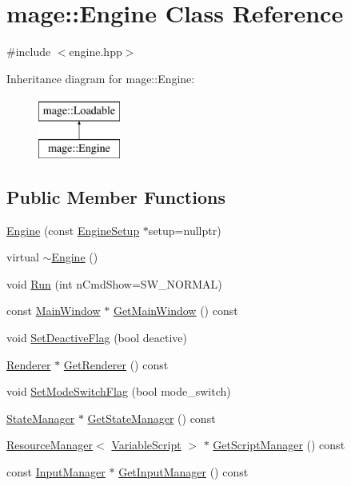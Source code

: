 \hypertarget{classmage_1_1_engine}{}\section{mage\+:\+:Engine Class Reference}
\label{classmage_1_1_engine}


{\ttfamily \#include $<$engine.\+hpp$>$}

Inheritance diagram for mage\+:\+:Engine\+:\begin{figure}[H]
\begin{center}
\leavevmode
\includegraphics[height=2.000000cm]{classmage_1_1_engine}
\end{center}
\end{figure}
\subsection*{Public Member Functions}
\begin{DoxyCompactItemize}
\item 
\hyperlink{classmage_1_1_engine_a4d15f81bb7d97b659d2d72ead3a88319}{Engine} (const \hyperlink{structmage_1_1_engine_setup}{Engine\+Setup} $\ast$setup=nullptr)
\item 
virtual \hyperlink{classmage_1_1_engine_a34628556f8397d70ed018d71e343c2f5}{$\sim$\+Engine} ()
\item 
void \hyperlink{classmage_1_1_engine_a246c82d0e55bc29e73aecbc365464ec8}{Run} (int n\+Cmd\+Show=S\+W\+\_\+\+N\+O\+R\+M\+AL)
\item 
const \hyperlink{classmage_1_1_main_window}{Main\+Window} $\ast$ \hyperlink{classmage_1_1_engine_a28baaa54158acac8ffca3b6f31f63f82}{Get\+Main\+Window} () const
\item 
void \hyperlink{classmage_1_1_engine_a942bfa9892fa79bb1068d7c7ec4e6732}{Set\+Deactive\+Flag} (bool deactive)
\item 
\hyperlink{classmage_1_1_renderer}{Renderer} $\ast$ \hyperlink{classmage_1_1_engine_a45a5005c7072937cb54a3f2f6431c66c}{Get\+Renderer} () const
\item 
void \hyperlink{classmage_1_1_engine_a8b574f0d702240d76fa98b2c79856d0d}{Set\+Mode\+Switch\+Flag} (bool mode\+\_\+switch)
\item 
\hyperlink{classmage_1_1_state_manager}{State\+Manager} $\ast$ \hyperlink{classmage_1_1_engine_a4f35bccc3784de531245a2549d537745}{Get\+State\+Manager} () const
\item 
\hyperlink{classmage_1_1_resource_manager}{Resource\+Manager}$<$ \hyperlink{classmage_1_1_variable_script}{Variable\+Script} $>$ $\ast$ \hyperlink{classmage_1_1_engine_af55c457336dcbc0e940578425c74d868}{Get\+Script\+Manager} () const
\item 
const \hyperlink{classmage_1_1_input_manager}{Input\+Manager} $\ast$ \hyperlink{classmage_1_1_engine_a627271c15bb1ecb1079f9780d64e0d77}{Get\+Input\+Manager} () const
\end{DoxyCompactItemize}
